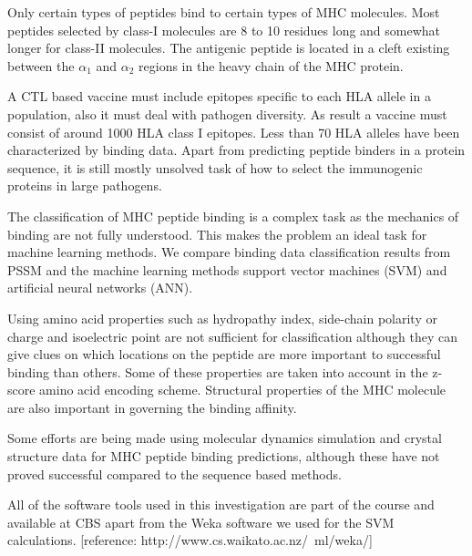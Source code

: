 Only certain types of peptides bind to certain types of MHC molecules. Most peptides selected by class-I molecules are 8 to 10 residues long
and somewhat longer for class-II molecules. The antigenic peptide is located in a cleft existing between the $\alpha_1$ and $\alpha_2$ regions in the heavy chain of the MHC protein.

A CTL based vaccine must include epitopes specific to each HLA allele in a population, also it must deal with pathogen diversity. As result a vaccine must consist of around 1000 HLA class I epitopes.
Less than 70 HLA alleles have been characterized by binding data. Apart from predicting peptide binders in a protein sequence, it is still  mostly unsolved task of how to select the immunogenic proteins in large pathogens.

The classification of MHC peptide binding is a complex task as the mechanics of binding are not fully understood. 
This makes the problem an ideal task for machine learning methods. We compare binding data classification results from PSSM and the machine learning methods support vector machines (SVM) and artificial neural networks (ANN).

Using amino acid properties such as hydropathy index, side-chain polarity or charge and isoelectric point are not sufficient for classification although they can give clues on which locations on the peptide are more important to successful binding than others. 
Some of these properties are taken into account in the z-score amino acid encoding scheme. Structural properties of the MHC molecule are also important in governing the binding affinity.

Some efforts are being made using molecular dynamics simulation and crystal structure data for MHC peptide binding predictions, although these have not proved successful compared to the sequence based methods.

All of the software tools used in this investigation are part of the course and available at CBS apart from the Weka software we used for the SVM calculations. [reference: http://www.cs.waikato.ac.nz/~ml/weka/]
